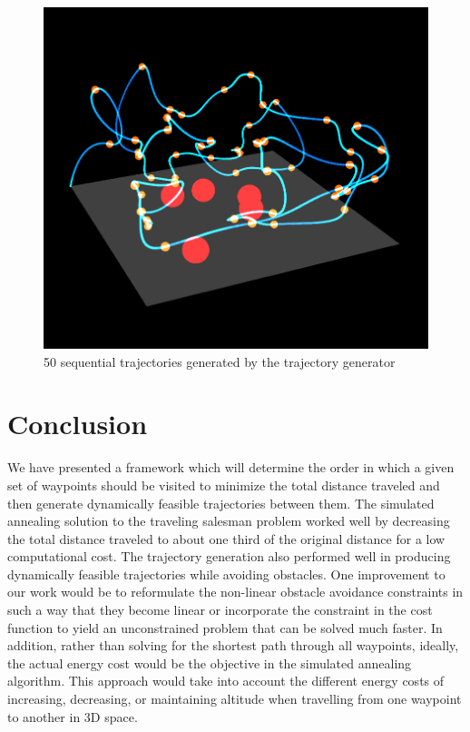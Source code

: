 \documentclass[letterpaper,conference, 10pt]{ieeeconf}
\begin{document}
\begin{figure}[bth]
    \centering
    \includegraphics[width=0.9\linewidth]{project_final.png}
    \caption{50 sequential trajectories generated by the trajectory generator}
    \label{fig:final_result}
\end{figure}

\section{Conclusion}

We have presented a framework which will determine the order in which a given set of waypoints should be visited to minimize the total distance traveled and then generate dynamically feasible trajectories between them. The simulated annealing solution to the traveling salesman problem worked well by decreasing the total distance traveled to about one third of the original distance for a low computational cost. The trajectory generation also performed well in producing dynamically feasible trajectories while avoiding obstacles. One improvement to our work would be to reformulate the non-linear obstacle avoidance constraints in such a way that they become linear or incorporate the constraint in the cost function to yield an unconstrained problem that can be solved much faster. In addition, rather than solving for the shortest path through all waypoints, ideally, the actual energy cost would be the objective in the simulated annealing algorithm. This approach would take into account the different energy costs of increasing, decreasing, or maintaining altitude when travelling from one waypoint to another in 3D space.



\end{document}
